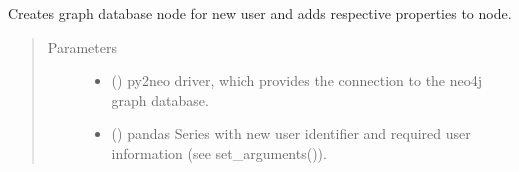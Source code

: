 \documentclass[letterpaper,10pt,english]{sphinxmanual}
\begin{document}
\begin{fulllineitems}
\label{\detokenize{_autosummary/graphdb_builder.builder:graphdb_builder.builder.create_user.create_user_node}}
Creates graph database node for new user and adds respective properties to node.
\begin{quote}\begin{description}
\item[{Parameters}] \leavevmode\begin{itemize}
\item {} 
 () \textendash{} py2neo driver, which provides the connection to the neo4j graph database.

\item {} 
 () \textendash{} pandas Series with new user identifier and required user information (see set\_arguments()).

\end{itemize}

\end{description}\end{quote}

\end{fulllineitems}

\end{document}

